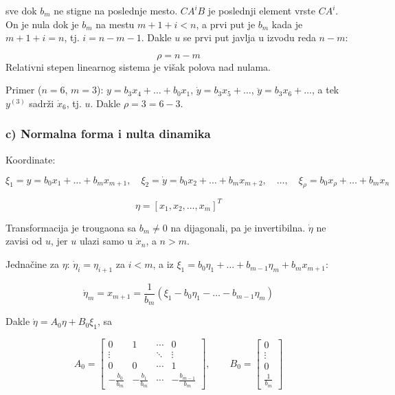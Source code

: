 \documentclass[11pt,a4paper,parskip=half,headsepline,numbers=noenddot]{scrartcl}
\begin{document}
sve dok \(b_m\) ne stigne na poslednje mesto. \(CA^iB\) je poslednji element vrste \(CA^i\). On je nula dok je \(b_m\) na mestu \(m + 1 + i < n\), a prvi put je \(b_m\) kada je \(m + 1 + i = n\), tj. \(i = n - m - 1\). Dakle \(u\) se prvi put javlja u izvodu reda \(n - m\):

\begin{kljucna}
\[\rho = n - m\]
Relativni stepen linearnog sistema je višak polova nad nulama.
\end{kljucna}

Primer (\(n = 6\), \(m = 3\)): \(y = b_3x_4 + \dots + b_0x_1\), \(\dot y = b_3x_5 + \dots\), \(\ddot y = b_3x_6 + \dots\), a tek \(y^{(3)}\) sadrži \(\dot x_6\), tj. \(u\). Dakle \(\rho = 3 = 6 - 3\).

\subsubsection{c) Normalna forma i nulta dinamika}

Koordinate:

\[\xi_1 = y = b_0x_1 + \dots + b_mx_{m+1}, \quad \xi_2 = \dot y = b_0x_2 + \dots + b_mx_{m+2}, \quad \dots, \quad \xi_\rho = b_0x_\rho + \dots + b_mx_n\]

\[\eta = [x_1, x_2, \dots, x_m]^T\]

Transformacija je trougaona sa \(b_m \ne 0\) na dijagonali, pa je invertibilna. \(\dot\eta\) ne zavisi od \(u\), jer \(u\) ulazi samo u \(\dot x_n\), a \(n > m\).

Jednačine za \(\eta\): \(\dot\eta_i = \eta_{i+1}\) za \(i < m\), a iz \(\xi_1 = b_0\eta_1 + \dots + b_{m-1}\eta_m + b_mx_{m+1}\):

\[\dot\eta_m = x_{m+1} = \frac{1}{b_m}\left(\xi_1 - b_0\eta_1 - \dots - b_{m-1}\eta_m\right)\]

Dakle \(\dot\eta = A_0\eta + B_0\xi_1\), sa

\[
A_0 = \begin{bmatrix}
0 & 1 & \cdots & 0 \\
\vdots & & \ddots & \vdots \\
0 & 0 & \cdots & 1 \\
-\frac{b_0}{b_m} & -\frac{b_1}{b_m} & \cdots & -\frac{b_{m-1}}{b_m}
\end{bmatrix}, \qquad
B_0 = \begin{bmatrix} 0 \\ \vdots \\ 0 \\ \frac{1}{b_m} \end{bmatrix}
\]
\end{document}
